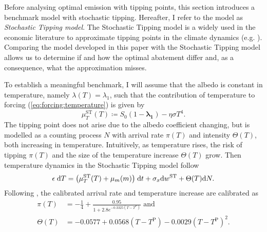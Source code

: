 \documentclass[../../main.tex]{subfiles}
\begin{document}
Before analysing optimal emission with tipping points, this section introduces a benchmark model with stochastic tipping. Hereafter, I refer to the model as \textit{Stochastic Tipping model}. The Stochastic Tipping model is a widely used in the economic literature to approximate tipping points in the climate dynamics (e.g. ). Comparing the model developed in this paper with the Stochastic Tipping model allows us to determine if and how the optimal abatement differ and, as a consequence, what the approximation misses.

To establish a meaningful benchmark, I will assume that the albedo is constant in temperature, namely $\lambda(T) = \lambda_1$, such that the contribution of temperature to forcing (\ref{eq:forcing:temperature}) is given by \begin{equation}
    \mu^{\mathrm{ST}}_T(T) \coloneqq S_0 (1 - \mathbf{\lambda_1}) - \eta\sigma T^4.
\end{equation} The tipping point does not arise due to the albedo coefficient changing, but is modelled as a counting process $N$ with arrival rate $\pi(T)$ and intensity $\Theta(T)$, both increasing in temperature. Intuitively, as temperature rises, the risk of tipping $\pi(T)$ and the size of the temperature increase $\Theta(T)$ grow. Then temperature dynamics in the Stochastic Tipping model follow \begin{equation}
    \epsilon \; \mathrm{d}T = \big(\mu^{\mathrm{ST}}_T(T)  + \mu_m(m) \big) \; \mathrm{d}t + \sigma_x \mathrm{d}w^{\mathrm{ST}} + \Theta(T) \mathrm{d}N.
\end{equation} Following , the calibrated arrival rate and temperature increase are calibrated as \begin{align}
    \pi(T) &=  -\frac{1}{4} + \frac{0.95}{1 + 2.8 e^{-0.3325 (T - T^{\mathrm{P}})}} \text{ and } \\
    \Theta(T) &= -0.0577 + 0.0568 (T - T^{\mathrm{P}})-0.0029(T - T^{\mathrm{P}})^2.
\end{align}
\end{document}
